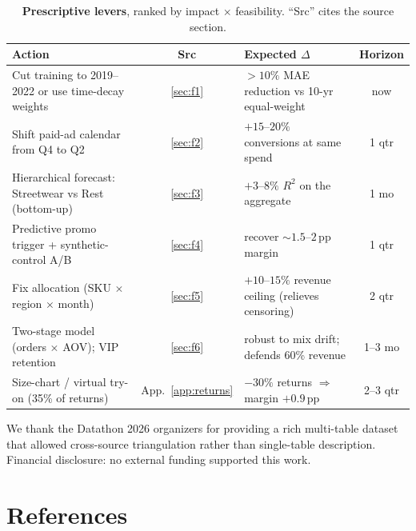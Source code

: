 \documentclass{article}
\begin{document}
\begin{table}[t]
  \caption{\textbf{Prescriptive levers}, ranked by impact $\times$ feasibility. ``Src'' cites the source section.}
  \label{tab:recs}
  \centering
  \small
  \begin{tabular}{@{}p{4.7cm} c p{4.5cm} c@{}}
    \toprule
    \textbf{Action} & \textbf{Src} & \textbf{Expected $\Delta$} & \textbf{Horizon} \\
    \midrule
    Cut training to 2019--2022 or use time-decay weights       & \ref{sec:f1} & $>\!10\%$ MAE reduction vs 10-yr equal-weight & now \\
    Shift paid-ad calendar from Q4 to Q2                       & \ref{sec:f2} & $+15$--$20\%$ conversions at same spend & 1 qtr \\
    Hierarchical forecast: Streetwear vs Rest (bottom-up)      & \ref{sec:f3} & $+3$--$8\%$ $R^2$ on the aggregate & 1 mo \\
    Predictive promo trigger + synthetic-control A/B           & \ref{sec:f4} & recover $\sim\!1.5$--$2$\,pp margin & 1 qtr \\
    Fix allocation (SKU $\times$ region $\times$ month)        & \ref{sec:f5} & $+10$--$15\%$ revenue ceiling (relieves censoring) & 2 qtr \\
    Two-stage model (orders $\times$ AOV); VIP retention       & \ref{sec:f6} & robust to mix drift; defends 60\% revenue & 1--3 mo \\
    Size-chart / virtual try-on (35\% of returns)              & App.~\ref{app:returns} & $-30\%$ returns $\Rightarrow$ margin $+0.9$\,pp & 2--3 qtr \\
    \bottomrule
  \end{tabular}
\end{table}

\begin{ack}
We thank the Datathon 2026 organizers for providing a rich multi-table dataset that allowed cross-source triangulation rather than single-table description. Financial disclosure: no external funding supported this work.
\end{ack}



\section*{References}
\end{document}
